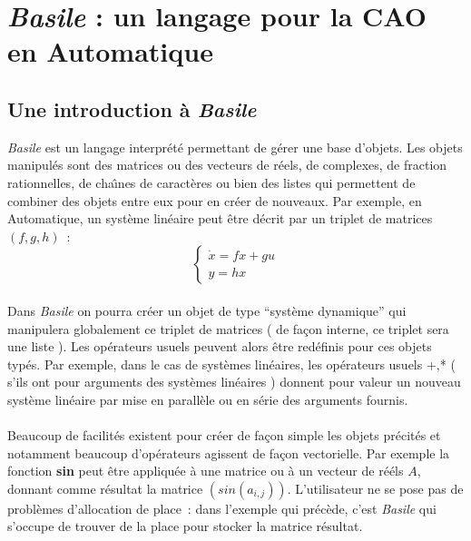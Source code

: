 \section{{\em Basile} : un langage pour la CAO en Automatique}


\subsection{Une introduction \`a {\em Basile}}

{\em Basile} est un langage interpr\'et\'e permettant de g\'erer
 une base d'objets. 
 Les objets manipul\'es sont des matrices ou des vecteurs de r\'eels,
 de complexes, de fraction rationnelles, de cha{\^{\i}}nes de caract\`eres ou 
bien des listes qui permettent de combiner des objets entre eux
 pour en cr\'eer de nouveaux.
 Par exemple, en Automatique, un syst\`eme lin\'eaire peut \^etre d\'ecrit
 par un triplet de matrices $(f,g,h)$~:
\[ \left\{ \begin{array}{l} {\displaystyle \dot{x}=fx+gu}
	  \\[3mm]
	{\displaystyle  y=hx} 
	\end{array} \right.
\]

\paragraph{}Dans {\em Basile} on pourra cr\'eer un objet de type 
``syst\`eme dynamique'' qui 
 manipulera globalement ce triplet de matrices ( de fa\c{c}on interne, ce 
triplet sera une liste ). Les op\'erateurs usuels peuvent alors
 \^etre red\'efinis 
 pour ces objets typ\'es. Par exemple, dans le cas de syst\`emes lin\'eaires, 
 les op\'erateurs usuels +,* ( s'ils ont pour arguments des 
syst\`emes lin\'eaires ) donnent pour valeur un nouveau syst\`eme 
lin\'eaire par mise en parall\`ele 
 ou en s\'erie des arguments fournis.

\paragraph{}Beaucoup de facilit\'es existent pour cr\'eer de fa\c{c}on 
 simple les objets pr\'ecit\'es et notamment beaucoup d'op\'erateurs agissent 
 de fa\c{c}on vectorielle. Par exemple la fonction {\bf sin} peut \^etre 
 appliqu\'ee \`a une matrice ou \`a un vecteur de r\'e\'els $A$, 
donnant comme  r\'esultat la matrice $( sin(a_{i,j}))$.
 L'utilisateur ne se pose pas de probl\`emes d'allocation de place~: 
dans l'exemple qui pr\'ec\`ede, c'est {\em Basile} 
 qui s'occupe de trouver de la place pour stocker la matrice r\'esultat. 

